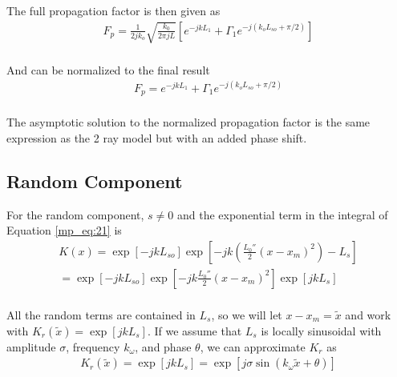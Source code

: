 The full propagation factor is then given as
\begin{equation}
\begin{gathered}
F_p= \frac{1}{2jk_o}\sqrt{\frac{k_0}{2\pi jL}}\left[e^{-jkL_1} + \Gamma_1e^{-j\left(k_oL_{so}+\pi/2\right)}\right] \\
\end{gathered}
\label{mp_eq:27b}
\end{equation}
\renewcommand{\baselinestretch}{2} \small\normalsize

And can be normalized to the final result
\begin{equation}
\begin{gathered}
\boxed{F_p= e^{-jkL_1} + \Gamma_1e^{-j\left(k_oL_{so}+\pi/2\right)}} \\
\end{gathered}
\label{mp_eq:28}
\end{equation}
\renewcommand{\baselinestretch}{2} \small\normalsize

The asymptotic solution to the normalized propagation factor is the same expression as the 2 ray model but with an added phase shift.

\subsection{Random Component}
For the random component, $s \neq 0$ and the exponential term in the integral of Equation \ref{mp_eq:21} is
\begin{equation}
\begin{gathered}
K(x) = \exp\left[-jkL_{so}\right]\exp\left[-jk\left(\frac{L_0''}{2}\left(x-x_m\right)^2 \right) -L_s\right] \\
=\exp\left[-jkL_{so}\right]\exp\left[-jk\frac{L_0''}{2}\left(x-x_m\right)^2\right]\exp\left[jkL_s\right] \\
\end{gathered}
\label{mp_eq:29}
\end{equation}
\renewcommand{\baselinestretch}{2} \small\normalsize

All the random terms are contained in $L_s$, so we will let $x-x_m = \tilde{x}$ and work with $K_r(\tilde{x}) = \exp\left[jkL_s \right]$. If we assume that $L_s$ is locally sinusoidal with amplitude $\sigma$, frequency $k_{\omega}$, and phase $\theta$, we can approximate $K_r$ as 
\begin{equation}
\begin{gathered}
K_r(\tilde{x}) = \exp\left[jkL_s\right] =\exp\left[j\sigma \sin\left(k_{\omega} \tilde{x} + \theta\right) \right]
\end{gathered}
\label{mp_eq:30}
\end{equation}
\renewcommand{\baselinestretch}{2} \small\normalsize

